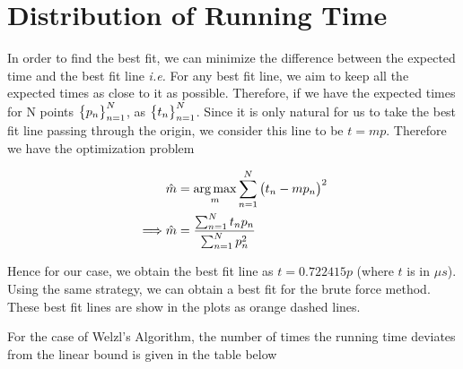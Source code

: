\documentclass{article}
\begin{document}
\section*{Distribution of Running Time}
\begin{margin}

    In order to find the best fit, we can minimize the difference between the expected time and the best fit line \textit{i.e.} For any best fit line, we aim to keep all the expected times as close to it as possible. Therefore, if we have the expected times for N points $\big\{ p_n \big\}_{n = 1}^{N}$, as $\big\{ t_n \big\}_{n = 1}^{N}$. Since it is only natural for us to take the best fit line passing through the origin, we consider this line to be $t = mp$. Therefore we have the optimization problem

    \begin{align*}
                    &\hat{m} = \mathop{\arg\max}_{m} \sum_{n = 1}^{N} \big(t_n - mp_n \big)^{2} \\
        \implies    &\hat{m} = \frac{\sum_{n = 1}^{N} t_n p_n}{\sum_{n = 1}^{N} p_n^2}
    \end{align*} \br%

    Hence for our case, we obtain the best fit line as $t = 0.722415p$ (where $t$ is in $\mu s$). Using the same strategy, we can obtain a best fit for the brute force method. These best fit lines are show in the plots as orange dashed lines. \br%
   
    \clearpage

    For the case of Welzl's Algorithm, the number of times the running time deviates from the linear bound is given in the table below


\end{margin}
\end{document}
